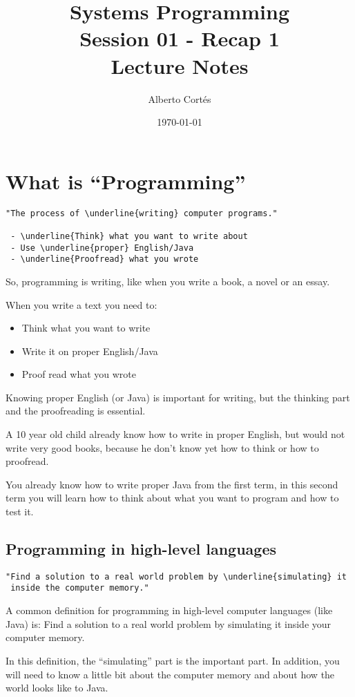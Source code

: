 \documentclass[8pt, a4paper, oneside]{extarticle}
\newcommand{\realtitle}{Session 01 - Recap 1}
\begin{document}
\title{Systems Programming\\\realtitle\\Lecture Notes}
\author{Alberto Cortés}
\date{\today}
\maketitle

\section{What is ``Programming''}

\begin{multicols}{2}
  \begin{Verbatim}
"The process of \underline{writing} computer programs."

 - \underline{Think} what you want to write about
 - Use \underline{proper} English/Java
 - \underline{Proofread} what you wrote
  \end{Verbatim}
  \columnbreak

  So, programming is writing,
  like when you write a book, a novel or an essay.

  When you write a text you need to:
  \begin{itemize}
    \item Think what you want to write
    \item Write it on proper English/Java
    \item Proof read what you wrote
  \end{itemize}

  Knowing proper English (or Java) is important for writing, but the thinking
  part and the proofreading is essential.

  A 10 year old child already know how to write in proper English, but would
  not write very good books, because he don't know yet how to think or how to
  proofread.

  You already know how to write proper Java from the first term, in this second
  term you will learn how to think about what you want to program and how to
  test it.
\end{multicols}

\subsection{Programming in high-level languages}

\begin{multicols}{2}
\begin{Verbatim}
"Find a solution to a real world problem by \underline{simulating} it
 inside the computer memory."
\end{Verbatim}
  \columnbreak

  A common definition for programming in high-level computer languages (like
  Java) is: Find a solution to a real world problem by simulating it inside
  your computer memory.

  In this definition, the ``simulating'' part is the important part. In
  addition, you will need to know a little bit about the computer memory
  and about how the world looks like to Java.

\end{multicols}
\end{document}
